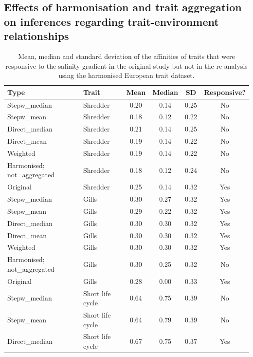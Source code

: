 \documentclass[12pt]{article}
\begin{document}
\newpage

\subsection*{Effects of harmonisation and trait aggregation on inferences regarding trait-environment relationships}
\label{sec:effects_harmonisation_trait_env_rel}

\begin{table}[H]
    \centering
    \caption{Mean, median and standard deviation of the affinities of traits that were responsive to the salinity gradient in the original study but not in the re-analysis using the harmonised European trait dataset.} 
    \label{tab:SI_resp_traits_summary_stats}
    \begin{tabular}{l|l|c|c|c|c}
    \toprule[.1em]
    Type & Trait & Mean & Median & SD & Responsive? \\ 
    \toprule[.1em]
    Stepw\_median & Shredder & 0.20 & 0.14 & 0.25 & No \\ 
      Stepw\_mean & Shredder & 0.18 & 0.12 & 0.22 & No\\ 
      Direct\_median & Shredder & 0.21 & 0.14 & 0.25 & No\\ 
      Direct\_mean & Shredder & 0.19 & 0.14 & 0.22 & No\\ 
      Weighted & Shredder & 0.19 & 0.14 & 0.22 & No \\ 
      Harmonised; not\_aggregated & Shredder & 0.18 & 0.12 & 0.24 & No \\ 
      Original & Shredder & 0.25 & 0.14 & 0.32 & Yes\\ 
      \midrule
      Stepw\_median & Gills & 0.30 & 0.27 & 0.32 & Yes\\ 
      Stepw\_mean & Gills & 0.29 & 0.22 & 0.32 & Yes\\ 
      Direct\_median & Gills & 0.30 & 0.30 & 0.32 & Yes\\ 
      Direct\_mean & Gills & 0.30 & 0.30 & 0.32 & Yes\\ 
      Weighted & Gills & 0.30 & 0.30 & 0.32 & Yes\\ 
      Harmonised; not\_aggregated & Gills & 0.30 & 0.25 & 0.32 & No \\ 
      Original & Gills & 0.28 & 0.00 & 0.33 & Yes \\ 
      \midrule
      Stepw\_median & Short life cycle & 0.64 & 0.75 & 0.39 & No \\ 
      Stepw\_mean & Short life cycle & 0.64 & 0.79 & 0.39 & No \\ 
      Direct\_median & Short life cycle & 0.67 & 0.75 & 0.37 & Yes \\ 

\end{tabular}
\end{table}
\end{document}
